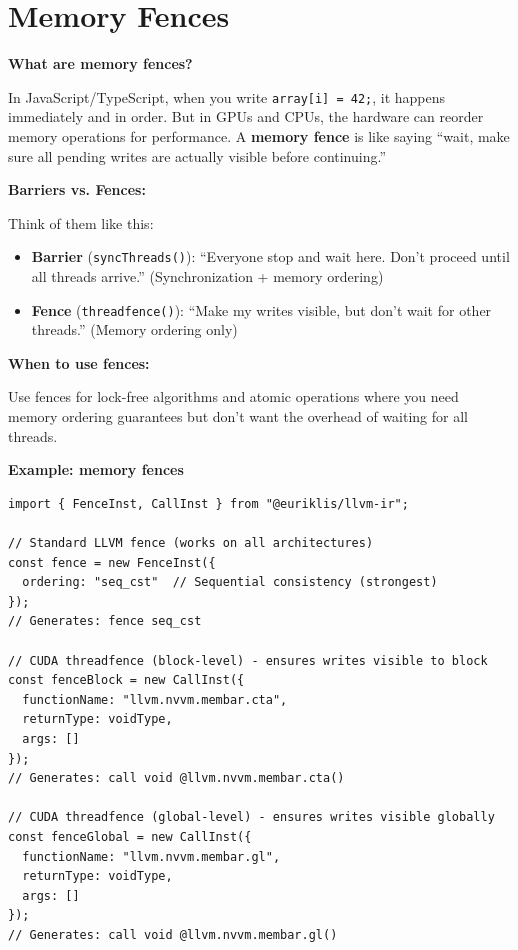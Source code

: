 \section{Memory Fences}

\textbf{What are memory fences?}

In JavaScript/TypeScript, when you write \texttt{array[i] = 42;}, it happens immediately and in order. But in GPUs and CPUs, the hardware can reorder memory operations for performance. A \textbf{memory fence} is like saying ``wait, make sure all pending writes are actually visible before continuing.''

\textbf{Barriers vs. Fences:}

Think of them like this:
\begin{itemize}[noitemsep]
  \item \textbf{Barrier} (\texttt{syncThreads()}): ``Everyone stop and wait here. Don't proceed until all threads arrive.'' (Synchronization + memory ordering)
  \item \textbf{Fence} (\texttt{threadfence()}): ``Make my writes visible, but don't wait for other threads.'' (Memory ordering only)
\end{itemize}

\textbf{When to use fences:}

Use fences for lock-free algorithms and atomic operations where you need memory ordering guarantees but don't want the overhead of waiting for all threads.

\textbf{Example:  memory fences}

\begin{lstlisting}[style=ts]
import { FenceInst, CallInst } from "@euriklis/llvm-ir";

// Standard LLVM fence (works on all architectures)
const fence = new FenceInst({
  ordering: "seq_cst"  // Sequential consistency (strongest)
});
// Generates: fence seq_cst

// CUDA threadfence (block-level) - ensures writes visible to block
const fenceBlock = new CallInst({
  functionName: "llvm.nvvm.membar.cta",
  returnType: voidType,
  args: []
});
// Generates: call void @llvm.nvvm.membar.cta()

// CUDA threadfence (global-level) - ensures writes visible globally
const fenceGlobal = new CallInst({
  functionName: "llvm.nvvm.membar.gl",
  returnType: voidType,
  args: []
});
// Generates: call void @llvm.nvvm.membar.gl()
\end{lstlisting}

